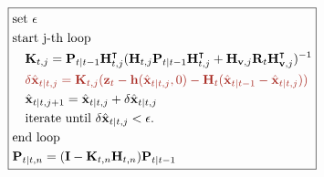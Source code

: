 \documentclass[10pt]{article}
\begin{document}
	\begin{equation} \label{eq:iekf-cor}
		\boxed {\begin{aligned}
				& \text{set } \epsilon \\
				&  \text{start j-th loop }  \\
				&  \quad   \mathbf{K}_{t,j} = \mathbf{P}_{t|t-1} \mathbf{H}_{t,j}^{\intercal}(\mathbf{H}_{t,j}\mathbf{P}_{t|t-1} \mathbf{H}_{t,j}^{\intercal} + \mathbf{H}_{\mathbf{v},j}\mathbf{R}_{t}\mathbf{H}_{\mathbf{v},j}^{\intercal})^{-1} \\
				& {\color{Mahogany} \quad \delta \hat{\mathbf{x}}_{t|t,j} = \mathbf{K}_{t,j} (\mathbf{z}_{t} - \mathbf{h}(\hat{\mathbf{x}}_{t|t,j}, 0) - \mathbf{H}_{t}(\hat{\mathbf{x}}_{t|t-1} - \hat{\mathbf{x}}_{t|t,j})) } \\
				& \quad \hat{\mathbf{x}}_{t|t, j+1}  = \hat{\mathbf{x}}_{t|t, j} + \delta \hat{\mathbf{x}}_{t|t,j} \\
				& \quad \text{iterate until } \delta \hat{\mathbf{x}}_{t|t,j} < \epsilon.   \\ 
				& \text{end loop} \\ 
				&     \mathbf{P}_{t|t,n}    = (\mathbf{I} - \mathbf{K}_{t,n}\mathbf{H}_{t,n}) \mathbf{P}_{t|t-1}  \\
		\end{aligned} }
	\end{equation}
	
	
\end{document}
